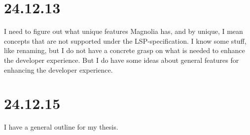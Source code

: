 \section{24.12.13}

I need to figure out what unique features Magnolia has, and by unique, I mean
concepts that are not supported under the LSP-specification. I know some stuff,
like renaming, but I do not have a concrete grasp on what is needed to enhance
the developer experience. But I do have some ideas about general features for
enhancing the developer experience.

\section{24.12.15}

I have a general outline for my thesis.

